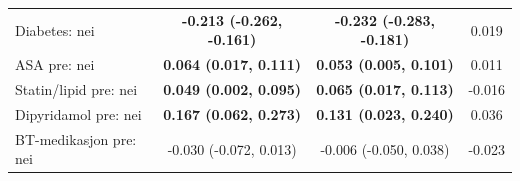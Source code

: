 \begin{longtable}{p{5.2cm}ccc}
  Diabetes: nei                                                              & \textbf{-0.213 (-0.262, -0.161)} & \textbf{-0.232 (-0.283, -0.181)} & 0.019                       \\
  ASA pre: nei                                                               & \textbf{0.064 (0.017, 0.111)}    & \textbf{0.053 (0.005, 0.101)}    & 0.011                       \\
  Statin/lipid pre: nei                                                      & \textbf{0.049 (0.002, 0.095)}    & \textbf{0.065 (0.017, 0.113)}    & -0.016                      \\
  Dipyridamol pre: nei                                                       & \textbf{0.167 (0.062, 0.273)}    & \textbf{0.131 (0.023, 0.240)}    & 0.036                       \\
  BT-medikasjon pre: nei                                                     & -0.030 (-0.072, 0.013)           & -0.006 (-0.050, 0.038)           & -0.023                      \\
\end{longtable}
